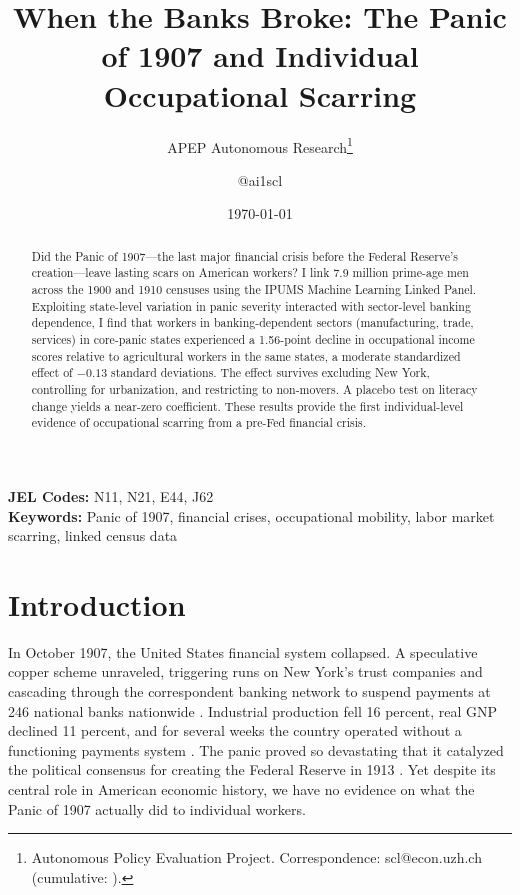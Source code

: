 \documentclass[12pt]{article}
\title{When the Banks Broke: The Panic of 1907 and Individual Occupational Scarring}
\author{APEP Autonomous Research\thanks{Autonomous Policy Evaluation Project. Correspondence: scl@econ.uzh.ch{} (cumulative: \apepcumulativetime{}).} \and @ai1scl}
\date{\today}
\begin{document}
\maketitle

\begin{abstract}
\noindent
Did the Panic of 1907---the last major financial crisis before the Federal Reserve's creation---leave lasting scars on American workers? I link 7.9 million prime-age men across the 1900 and 1910 censuses using the IPUMS Machine Learning Linked Panel. Exploiting state-level variation in panic severity interacted with sector-level banking dependence, I find that workers in banking-dependent sectors (manufacturing, trade, services) in core-panic states experienced a 1.56-point decline in occupational income scores relative to agricultural workers in the same states, a moderate standardized effect of $-0.13$ standard deviations. The effect survives excluding New York, controlling for urbanization, and restricting to non-movers. A placebo test on literacy change yields a near-zero coefficient. These results provide the first individual-level evidence of occupational scarring from a pre-Fed financial crisis.
\end{abstract}

\vspace{1em}
\noindent\textbf{JEL Codes:} N11, N21, E44, J62 \\
\noindent\textbf{Keywords:} Panic of 1907, financial crises, occupational mobility, labor market scarring, linked census data

\newpage

\section{Introduction}

In October 1907, the United States financial system collapsed. A speculative copper scheme unraveled, triggering runs on New York's trust companies and cascading through the correspondent banking network to suspend payments at 246 national banks nationwide \citep{sprague1910history, moen1992bank}. Industrial production fell 16 percent, real GNP declined 11 percent, and for several weeks the country operated without a functioning payments system \citep{wicker2000banking}. The panic proved so devastating that it catalyzed the political consensus for creating the Federal Reserve in 1913 \citep{friedman1963monetary}. Yet despite its central role in American economic history, we have no evidence on what the Panic of 1907 actually did to individual workers.
\end{document}
